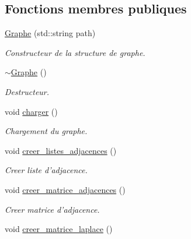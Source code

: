 \subsection*{Fonctions membres publiques}
\begin{DoxyCompactItemize}
\item 
\hyperlink{classGraphe_a3d3949338bc93bf4edcfdc7310e4234f}{Graphe} (std\+::string path)
\begin{DoxyCompactList}\small\item\em Constructeur de la structure de graphe. \end{DoxyCompactList}\item 
\hypertarget{classGraphe_a673c897db564767e9ace7169a5357310}{\hyperlink{classGraphe_a673c897db564767e9ace7169a5357310}{$\sim$\+Graphe} ()}\label{classGraphe_a673c897db564767e9ace7169a5357310}

\begin{DoxyCompactList}\small\item\em Destructeur. \end{DoxyCompactList}\item 
void \hyperlink{classGraphe_a983bd623b721d7485805d252008d82f4}{charger} ()
\begin{DoxyCompactList}\small\item\em Chargement du graphe. \end{DoxyCompactList}\item 
\hypertarget{classGraphe_ae6dabb6a2315a88f7e0b35956d59a46b}{void \hyperlink{classGraphe_ae6dabb6a2315a88f7e0b35956d59a46b}{creer\+\_\+listes\+\_\+adjacences} ()}\label{classGraphe_ae6dabb6a2315a88f7e0b35956d59a46b}

\begin{DoxyCompactList}\small\item\em Creer liste d'adjacence. \end{DoxyCompactList}\item 
\hypertarget{classGraphe_ad6bf6139a94a026f4288e5ba1eb53e08}{void \hyperlink{classGraphe_ad6bf6139a94a026f4288e5ba1eb53e08}{creer\+\_\+matrice\+\_\+adjacences} ()}\label{classGraphe_ad6bf6139a94a026f4288e5ba1eb53e08}

\begin{DoxyCompactList}\small\item\em Creer matrice d'adjacence. \end{DoxyCompactList}\item 
\hypertarget{classGraphe_a01a623b6cfe3fcc38ef3ed0d3eb13226}{void \hyperlink{classGraphe_a01a623b6cfe3fcc38ef3ed0d3eb13226}{creer\+\_\+matrice\+\_\+laplace} ()}\label{classGraphe_a01a623b6cfe3fcc38ef3ed0d3eb13226}


\end{DoxyCompactItemize}
